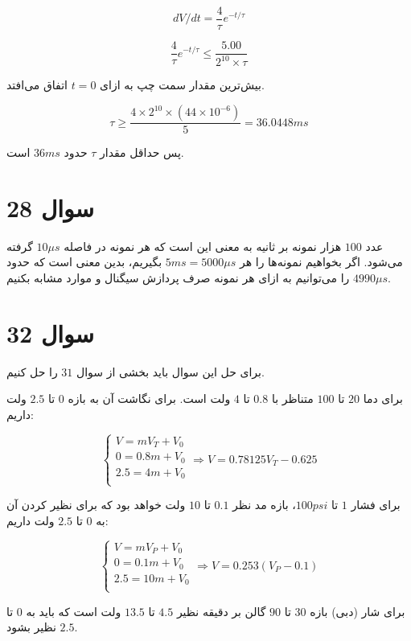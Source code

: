 \documentclass[12pt]{article}
\begin{document}
$$dV/dt = \frac{4}{\tau} e^{-t/\tau}$$

$$\frac{4}{\tau} e^{-t / \tau} \leq \frac{5.00}{2^{10} \times \tau}$$

بیش‌ترین مقدار سمت چپ به ازای $t=0$ اتفاق می‌افتد.

$$\tau \geq \frac{4 \times 2^{10} \times (44 \times 10^{-6})}{5} = 36.0448 ms$$

پس حداقل مقدار $\tau$ حدود $36ms$ است.



\section*{سوال 28}

عدد $100$ هزار نمونه بر ثانیه به معنی این است که هر نمونه در فاصله $10 \mu s$ گرفته می‌شود. اگر بخواهیم نمونه‌ها را هر $5ms = 5000 \mu s$ بگیریم، بدین معنی است که حدود $4990 \mu s$ را می‌توانیم به ازای هر نمونه صرف پردازش سیگنال و موارد مشابه بکنیم.



\section*{سوال 32}


برای حل این سوال باید بخشی از سوال $31$ را حل کنیم.

برای دما $20$ تا $100$ متناظر با $0.8$ تا $4$ ولت است. برای نگاشت آن به بازه $0$ تا $2.5$ ولت داریم:

$$\left\{\begin{array}{c}
	V = m V_T + V_0\\
	0 = 0.8 m + V_0\\
	2.5 = 4 m + V_0\\
\end{array}\right. \Rightarrow V=0.78125 V_T - 0.625$$


برای فشار $1$ تا $100psi$، بازه مد نظر $0.1$ تا $10$ ولت خواهد بود که برای نظیر کردن آن به $0$ تا $2.5$ ولت داریم:

$$\left\{\begin{array}{c}
	V = m V_P + V_0\\
	0 = 0.1 m + V_0\\
	2.5 = 10 m + V_0\\
\end{array}\right. \Rightarrow V=0.253(V_P - 0.1)$$


برای شار (دبی) بازه $30$ تا $90$ گالن بر دقیقه نظیر $4.5$ تا $13.5$ ولت است که باید به $0$ تا $2.5$ نظیر بشود.
\end{document}
